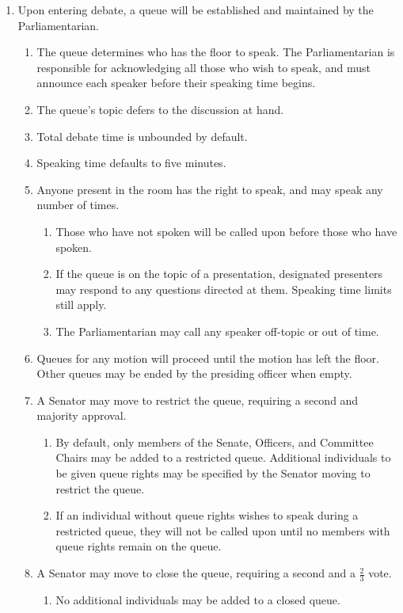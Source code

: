\documentclass{bylaws}
\begin{document}
\begin{enumerate}
\item Upon entering debate, a queue will be established and maintained by the Parliamentarian.
\begin{enumerate}
\item The queue determines who has the floor to speak. The Parliamentarian is responsible for acknowledging all those who wish
to speak, and must announce each speaker before their speaking time begins.
\item The queue’s topic defers to the discussion at hand.
\item Total debate time is unbounded by default.
\item Speaking time defaults to five minutes.
\item Anyone present in the room has the right to speak, and may speak any number of times.
\begin{enumerate}
\item Those who have not spoken will be called upon before those who have spoken.
\item If the queue is on the topic of a presentation, designated presenters may respond to any questions directed at them.
Speaking time limits still apply.
\item The Parliamentarian may call any speaker off-topic or out of time.
\end{enumerate}

\item Queues for any motion will proceed until the motion has left the floor. Other queues may be ended by the presiding officer
when empty.
\item A Senator may move to restrict the queue, requiring a second and majority approval.
\begin{enumerate}
\item By default, only members of the Senate, Officers, and Committee Chairs may be added to a restricted queue.
Additional individuals to be given queue rights may be specified by the Senator moving to restrict the queue.
\item If an individual without queue rights wishes to speak during a restricted queue, they will not be called upon until no
members with queue rights remain on the queue.
\end{enumerate}

\item A Senator may move to close the queue, requiring a second and a $\frac{2}{3}$ vote.
\begin{enumerate}
\item No additional individuals may be added to a closed queue.
\end{enumerate}


\end{enumerate}
\end{enumerate}
\end{document}
